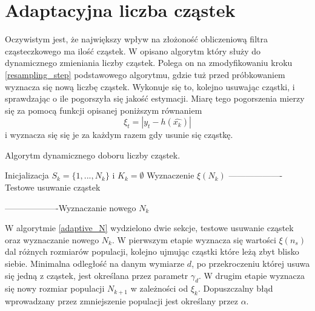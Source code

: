 \section{Adaptacyjna liczba cząstek}
Oczywistym jest, że największy wpływ na złożoność obliczeniową filtra cząsteczkowego ma ilość cząstek. W \cite{adaptive} opisano algorytm który służy do dynamicznego zmieniania liczby cząstek. Polega on na zmodyfikowaniu kroku \ref{resampling_step} podstawowego algorytmu, gdzie tuż przed próbkowaniem wyznacza się nową liczbę cząstek. Wykonuje się to, kolejno usuwając cząstki, i sprawdzając o ile pogorszyła się jakość estymacji. Miarę tego pogorszenia mierzy się za pomocą funkcji opisanej poniższym równaniem
\begin{equation}\label{ceana_pogorszenia}
	\xi_t = |y_t-h(\hat{x_k})|
\end{equation}
i wyznacza się się je za każdym razem gdy usunie się cząstkę.

\begin{algorithm}[H]
	\SetAlgoLined
	\DontPrintSemicolon
	\caption{Algorytm dynamicznego doboru liczby cząstek.} \label{adaptive_N}
	Inicjalizacja $S_k=\{1,...,N_k\}$ i $K_k=\emptyset$\;
	Wyznaczenie $\xi(N_k)$\;
	-------------------Testowe usuwanie cząstek\;

	-------------------Wyznaczanie nowego $N_k$\;
	
\end{algorithm}
W algorytmie \ref{adaptive_N} wydzielono dwie sekcje, testowe usuwanie cząstek oraz wyznaczanie nowego $N_k$. W pierwszym etapie wyznacza się wartości $\xi(n_s)$ dal różnych rozmiarów populacji, kolejno ujmując cząstki które leżą zbyt blisko siebie. Minimalna odległość na danym wymiarze $d$, po przekroczeniu której usuwa się jedną z cząstek, jest określana przez parametr $\gamma_d$. W drugim etapie wyznacza się nowy rozmiar populacji $N_{k+1}$ w zależności od $\xi_k$. Dopuszczalny błąd wprowadzany przez zmniejszenie populacji jest określany przez $\alpha$.

